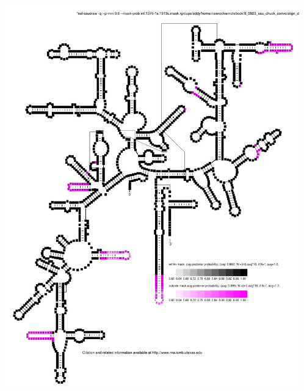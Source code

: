 \documentclass[landscape]{slides}
\begin{document}
\begin{slide}
\begin{center}
\includegraphics[height=6.5in]{figs/inf-lm}

\end{center}
\vfill
\end{slide}
\end{document}
